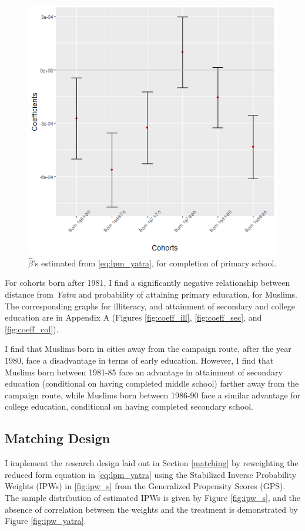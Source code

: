 \documentclass{article}
\begin{document}
\begin{figure}[H]
    \centering
    \includegraphics[scale = 0.6]{images/graph_coeff_pri.png}
    \caption{$\hat{\beta}$'s estimated from \eqref{eq:lpm_yatra}, for completion of primary school.}
    \label{fig:coeff_pri}
\end{figure}

For cohorts born after 1981, I find a significantly negative relationship between distance from \textit{Yatra} and probability of attaining primary education, for Muslims. The corresponding graphs for illiteracy, and attainment of secondary and college education are in Appendix A (Figures \ref{fig:coeff_ill}, \ref{fig:coeff_sec}, and \ref{fig:coeff_col}). 

I find that Muslims born in cities away from the campaign route, after the year 1980, face a disadvantage in terms of early education. However, I find that Muslims born between 1981-85 face an advantage in attainment of secondary education (conditional on having completed middle school) farther away from the campaign route, while Muslims born between 1986-90 face a similar advantage for college education, conditional on having completed secondary school.

\subsection{Matching Design}\label{matching_results}
I implement the research design laid out in Section \ref{matching} by reweighting the reduced form equation in \eqref{eq:lpm_yatra} using the Stabilized Inverse Probability Weights (IPWs) in \eqref{fig:ipw_s} from the Generalized Propensity Scores (GPS). The sample distribution of estimated IPWs is given by Figure \ref{fig:ipw_s}, and the absence of correlation between the weights and the treatment is demonstrated by Figure \ref{fig:ipw_yatra}.
\end{document}
